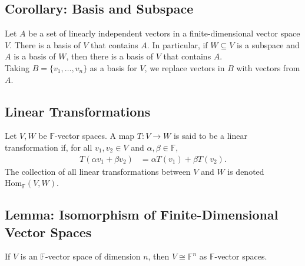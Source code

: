 \documentclass[10pt]{extarticle}
\begin{document}
  \subsection{Corollary: Basis and Subspace}%
  Let $A$ be a set of linearly independent vectors in a finite-dimensional vector space $V$. There is a basis of $V$ that contains $A$. In particular, if $W\subseteq V$ is a subspace and $A$ is a basis of $W$, then there is a basis of $V$ that contains $A$.\\

  Taking $B = \{v_1,\dots,v_n\}$ as a basis for $V$, we replace vectors in $B$ with vectors from $A$.
  \subsection{Linear Transformations}%
  Let $V,W$ be $\mathbb{F}$-vector spaces. A map $T:V\rightarrow W$ is said to be a linear transformation if, for all $v_1,v_2\in V$ and $\alpha,\beta \in \mathbb{F}$,
  \begin{align*}
    T(\alpha v_1 + \beta v_2) &= \alpha T(v_1) + \beta T(v_2).
  \end{align*}
  The collection of all linear transformations between $V$ and $W$ is denoted $\text{Hom}_{\mathbb{F}}(V,W)$.
  \subsection{Lemma: Isomorphism of Finite-Dimensional Vector Spaces}%
  If $V$ is an $\mathbb{F}$-vector space of dimension $n$, then $V\cong \mathbb{F}^{n}$ as $\mathbb{F}$-vector spaces.\\
\end{document}
